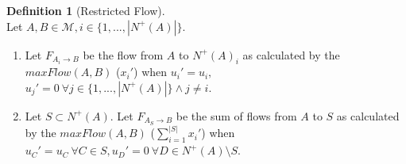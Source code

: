 \documentclass[11pt]{article}
\theoremstyle{definition}
\newtheorem{definition}{Definition}[section]
\theoremstyle{corollary}
\begin{document}
      \begin{definition}[Restricted Flow] \ \\
         Let $A, B \in \mathcal{M}, i \in \{1,...,|N^{+}(A)|\}$.
         \begin{enumerate}
            \item Let $F_{A_i \rightarrow B}$ be the flow from $A$ to $N^{+}(A)_i$ as calculated by the $maxFlow(A,B)$
               ($x_i'$) when $u_i' = u_i,$ \\ $u_j' = 0 \:\forall j \in \{1,...,|N^{+}(A)|\} \wedge j \neq i$.
            \item Let $S \subset N^{+}(A)$. Let $F_{A_S \rightarrow B}$ be the sum of flows from $A$ to $S$ as
               calculated by the $maxFlow(A,B)$ ($\sum\limits_{i=1}^{|S|}x_i'$) when $u_C' = u_C \: \forall C \in S,
               u_D' = 0 \: \forall D \in N^{+}(A) \setminus S$.
         \end{enumerate}
      \end{definition}
\end{document}
